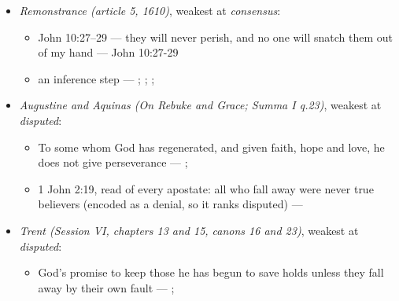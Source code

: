 \documentclass[11pt]{article}
\begin{document}
\begin{itemize}
\begin{itemize}
\item Hebrews 6:4–6 describes true believers who actually fall away --- \cite[449]{wesley-works-9-1827}
\item Hebrews 10:29 describes one truly sanctified by Christ’s blood who falls away --- \cite[448--449]{wesley-works-9-1827}; \cite[585]{wesley-explanatory-notes-nt}
\item 2 Peter 2:20–22 describes true believers who fall back into the world --- \cite[445--446]{wesley-works-9-1827}; \cite[625]{wesley-explanatory-notes-nt}
\item God’s promise to keep those he has begun to save holds unless they fall away by their own fault --- \cite[444--445]{wesley-works-9-1827}
\item Romans 8:29–30 is a chain from which no one drops: every one justified is glorified (encoded as a denial, so it ranks disputed) --- \cite[384]{wesley-explanatory-notes-nt}; \cite[413]{wesley-works-9-1827}
\end{itemize}
\item \emph{Remonstrance (article 5, 1610)}, weakest at \emph{consensus}:
\begin{itemize}
\item John 10:27–29 — they will never perish, and no one will snatch them out of my hand --- John 10:27-29
\item an inference step --- \cite[548--549]{schaff-creeds-christendom-3-1977}; \cite[603]{arminius-works-1-1825}; \cite[Solid Declaration XI.45]{concordia-triglotta-1921}; \cite[444--445]{wesley-works-9-1827}
\end{itemize}
\item \emph{Augustine and Aquinas (On Rebuke and Grace; Summa I q.23)}, weakest at \emph{disputed}:
\begin{itemize}
\item To some whom God has regenerated, and given faith, hope and love, he does not give perseverance --- \cite[478]{npnf1-05-1887}; \cite[On Rebuke and Grace, ch. 18]{npnf1-05-1887}
\item 1 John 2:19, read of every apostate: all who fall away were never true believers (encoded as a denial, so it ranks disputed) --- \cite[479--480]{npnf1-05-1887}
\end{itemize}
\item \emph{Trent (Session VI, chapters 13 and 15, canons 16 and 23)}, weakest at \emph{disputed}:
\begin{itemize}
\item God’s promise to keep those he has begun to save holds unless they fall away by their own fault --- \cite[Trent, Session VI (1547), ch. 13]{tanner-decrees-1990}; \cite[40]{waterworth-trent-1848}

\end{itemize}
\end{itemize}
\end{document}
